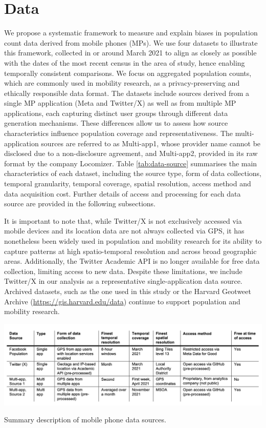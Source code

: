 \documentclass[]{rsos}%
\begin{document}
\section{Data}\label{data}

We propose a systematic framework to measure and explain biases in
population count data derived from mobile phones (MPs). We use four
datasets to illustrate this framework, collected in or around March 2021
to align as closely as possible with the dates of the most recent census
in the area of study, hence enabling temporally consistent comparisons.
We focus on aggregated population counts, which are commonly used in
mobility research, as a privacy-preserving and ethically responsible
data format. The datasets include sources derived from a single MP
application (Meta and Twitter/X) as well as from multiple MP
applications, each capturing distinct user groups through different data
generation mechanisms. These differences allow us to assess how source
characteristics influence population coverage and representativeness.
The multi-application sources are referred to as Multi-app1, whose
provider name cannot be disclosed due to a non-disclosure agreement, and
Multi-app2, provided in its raw format by the company Locomizer. Table
\ref{tab:data-source} summarises the main characteristics of each
dataset, including the source type, form of data collections, temporal
granularity, temporal coverage, spatial resolution, access method and
data acquisition cost. Further details of access and processing for each
data source are provided in the following subsections.

It is important to note that, while Twitter/X is not exclusively
accessed via mobile devices and its location data are not always
collected via GPS, it has nonetheless been widely used in population and
mobility research for its ability to capture patterns at high
spatio-temporal resolution and across broad geographic areas.
Additionally, the Twitter Academic API is no longer available for free
data collection, limiting access to new data. Despite these limitations,
we include Twitter/X in our analysis as a representative
single-application data source. Archived datasets, such as the one used
in this study or the Harvard Geotweet Archive
(\url{https://gis.harvard.edu/data}) continue to support population and
mobility research.

\begin{table}[h]
\centering
\includegraphics[width=1\linewidth]{figures/table-data-source.png}
\caption{Summary description of mobile phone data sources.}
\label{tab:data-source}
\end{table}
\end{document}
